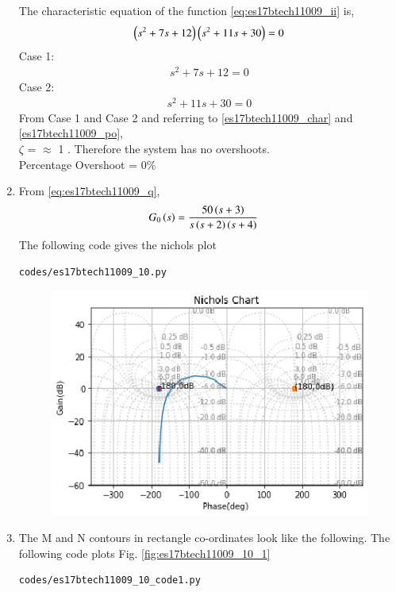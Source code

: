 \begin{enumerate}[label=\thesection.\arabic*.,ref=\thesection.\theenumi]
The characteristic equation of the function \eqref{eq:es17btech11009_ii} is,
\begin{align}
 \left(s^2 + 7s + 12\right) \left(s^2 + 11s + 30\right) = 0
 \end{align}
 Case 1:
 \begin{align}
s^2 + 7s + 12 = 0 
\end{align}
Case 2:
 \begin{align}
s^2 + 11s + 30 =0
 \end{align}
From Case 1 and Case 2 and referring to \eqref{es17btech11009_char} and \eqref{es17btech11009_po},
\\
  $\zeta$ = $\approx$ 1 . Therefore the system has no overshoots.
  \\
  Percentage Overshoot = 0\%
\\
\item
From \eqref{eq:es17btech11009_q},
\begin{align}
G_0\brak{s} &=\frac{50\brak{s+3}}{s\brak{s+2}\brak{s+4}}
\label{eq:es17btech11009_jj}
\end{align}
\solution 
The following code gives the nichols plot
\begin{lstlisting}
codes/es17btech11009_10.py
\end{lstlisting}

\begin{figure}[!h]
\includegraphics[width=\columnwidth]{./figs/es17btech11009_10.eps}
\caption{}
\label{fig:es17btech11009_10}
\end{figure}

\item
The M and N contours in rectangle co-ordinates look like the following.
The following code plots Fig. \ref{fig:es17btech11009_10_1}
\begin{lstlisting}
codes/es17btech11009_10_code1.py
\end{lstlisting}


\end{enumerate}
